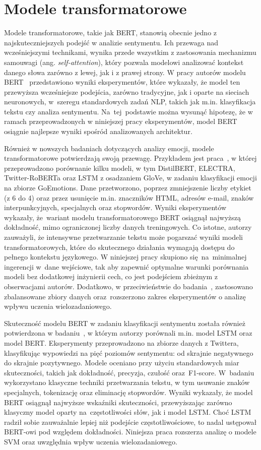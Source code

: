 \section{Modele transformatorowe}
Modele transformatorowe, takie jak BERT, stanowią obecnie jedno z najskuteczniejszych podejść w analizie sentymentu. Ich przewaga nad wcześniejszymi technikami, wynika przede wszystkim z zastosowania mechanizmu samouwagi (ang. \textit{self-attention}), który pozwala modelowi analizować kontekst danego słowa zarówno z lewej, jak i z prawej strony. W pracy autorów modelu BERT~\cite{BERT} przedstawiono wyniki eksperymentów, które wykazały, że model ten przewyższa wcześniejsze podejścia, zarówno tradycyjne, jak i oparte na sieciach neuronowych, w~szeregu standardowych zadań NLP, takich jak m.in. klasyfikacja tekstu czy analiza sentymentu. Na~tej~podstawie można wysunąć hipotezę, że w ramach przeprowadzonych w niniejszej pracy eksperymentów, model BERT osiągnie najlepsze wyniki spośród analizowanych architektur.

Również w nowszych badaniach dotyczących analizy emocji, modele transformatorowe potwierdzają swoją przewagę. Przykładem jest praca~\cite{EmotionTra}, w której przeprowadzono porównanie kilku modeli, w tym DistilBERT, ELECTRA, Twitter-RoBERTa oraz LSTM z osadzaniem GloVe, w zadaniu klasyfikacji emocji na zbiorze GoEmotions. Dane przetworzono, poprzez zmniejszenie liczby etykiet (z 6 do 4) oraz przez usunięcie m.in. znaczników HTML, adresów e-mail, znaków interpunkcyjnych, specjalnych oraz stopwordów. Wyniki eksperymentów wykazały, że~wariant modelu transformatorowego BERT osiągnął najwyższą dokładność, mimo ograniczonej liczby danych treningowych. Co istotne, autorzy zauważyli, że intensywne przetwarzanie tekstu może pogarszać wyniki modeli transformatorowych, które do skutecznego działania wymagają dostępu do pełnego kontekstu językowego. W niniejszej pracy skupiono się~na~minimalnej ingerencji w~dane wejściowe, tak aby zapewnić optymalne warunki porównania modeli bez dodatkowej inżynierii cech, co jest podejściem zbieżnym z obserwacjami autorów. Dodatkowo, w przeciwieństwie do badania~\cite{EmotionTra}, zastosowano zbalansowane zbiory danych oraz~rozszerzono zakres eksperymentów o analizę wpływu uczenia wielozadaniowego.

Skuteczność modelu BERT w zadaniu klasyfikacji sentymentu została również potwierdzona w badaniu~\cite{LSTMandBERT}, w którym autorzy porównali m.in. model LSTM oraz model BERT. Eksperymenty przeprowadzono na zbiorze danych z Twittera, klasyfikując wypowiedzi na pięć poziomów sentymentu: od skrajnie negatywnego do skrajnie pozytywnego. Modele oceniano przy użyciu standardowych miar skuteczności, takich jak dokładność, precyzja, czułość oraz~F1-score. W~badaniu wykorzystano klasyczne techniki przetwarzania tekstu, w tym usuwanie znaków specjalnych, tokenizację oraz eliminację stopwordów. Wyniki wykazały, że model BERT osiągnął najwyższe wskaźniki skuteczności, przewyższając zarówno klasyczny model oparty na~częstotliwości słów, jak i model LSTM. Choć LSTM radził sobie zauważalnie lepiej niż podejście częstotliwościowe, to nadal ustępował BERT-owi pod względem dokładności. Niniejsza praca rozszerza analizę o modele SVM oraz uwzględnia wpływ uczenia wielozadaniowego.

